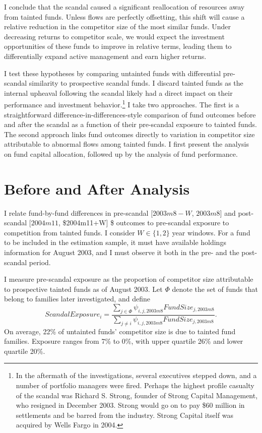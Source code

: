 \documentclass[openany]{book}
\let\rmarkdownfootnote\footnote%
\def\footnote{\protect\rmarkdownfootnote}
\theoremstyle{definition}
\theoremstyle{definition}
\theoremstyle{definition}
\theoremstyle{remark}
\begin{document}
I conclude that the scandal caused a significant reallocation of
resources away from tainted funds. Unless flows are perfectly
offsetting, this shift will cause a relative reduction in the competitor
size of the most similar funds. Under decreasing returns to competitor
scale, we would expect the investment opportunities of these funds to
improve in relative terms, leading them to differentially expand active
management and earn higher returns.

I test these hypotheses by comparing untainted funds with differential
pre-scandal similarity to prospective scandal funds. I discard tainted
funds as the internal upheaval following the scandal likely had a direct
impact on their performance and investment behavior.\footnote{In the
  aftermath of the investigations, several executives stepped down, and
  a number of portfolio managers were fired. Perhaps the highest profile
  casualty of the scandal was Richard S. Strong, founder of Strong
  Capital Management, who resigned in December 2003. Strong would go on
  to pay \$60 million in settlements and be barred from the industry.
  Strong Capital itself was acquired by Wells Fargo in 2004.} I take two
approaches. The first is a straightforward
difference-in-differences-style comparison of fund outcomes before and
after the scandal as a function of their pre-scandal exposure to tainted
funds. The second approach links fund outcomes directly to variation in
competitor size attributable to abnormal flows among tainted funds. I
first present the analysis on fund capital allocation, followed up by
the analysis of fund performance.

\hypertarget{sec:scandalID}{%
\section{Before and After Analysis}\label{sec:scandalID}}

I relate fund-by-fund differences in pre-scandal \([2003m8-W\),
\(2003m8]\) and post-scandal \([2004m11\), \$2004m11+W{]} \$ outcomes to
pre-scandal exposure to competition from tainted funds. I consider
\(W\in\{1,2\}\) year windows. For a fund to be included in the
estimation sample, it must have available holdings information for
August 2003, and I must observe it both in the pre- and the post-scandal
period.

I measure pre-scandal exposure as the proportion of competitor size
attributable to prospective tainted funds as of August 2003. Let
\(\Phi\) denote the set of funds that belong to families later
investigated, and define \begin{equation}
ScandalExposure_i = \frac{\sum_{j\in \Phi} \psi_{i,j,2003m8} FundSize_{j,2003m8}}{\sum_{j\neq i}\psi_{i,j,2003m8} FundSize_{j,2003m8}}.
\end{equation} On average, 22\% of untainted funds' competitor size is
due to tainted fund families. Exposure ranges from 7\% to 0\%, with
upper quartile 26\% and lower quartile 20\%.
\end{document}
